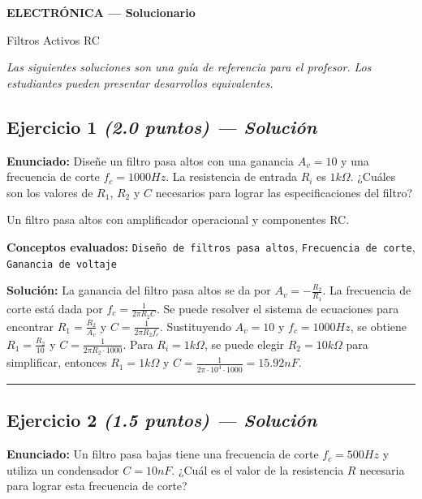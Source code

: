 \documentclass[11pt,a4paper]{article}
\newcommand{\bandaTitulo}[2]{%
  \begin{tcolorbox}[enhanced, colback=bandaAzul, colframe=bandaAzul,
    boxrule=0pt, arc=0pt, outer arc=0pt, width=\linewidth,
    halign=center, valign=center,
    top=14pt, bottom=14pt, left=10pt, right=10pt]
    {\LARGE\bfseries\color{white}#1}\par\vspace{4pt}%
    {\small\color{white!78!black}#2}%
  \end{tcolorbox}\vspace{8pt}}
\begin{document}
\bandaTitulo{ELECTRÓNICA --- Solucionario}{Filtros Activos RC}

\vspace{4pt}
\noindent\textit{Las siguientes soluciones son una guía de referencia para el profesor.}
\textit{Los estudiantes pueden presentar desarrollos equivalentes.}
\vspace{8pt}


\subsection*{Ejercicio 1 \normalfont\normalsize\textit{(2.0 puntos) --- Solución}}
\textbf{Enunciado:}
Diseñe un filtro pasa altos con una ganancia $A_v = 10$ y una frecuencia de corte $f_c = 1000 Hz$. La resistencia de entrada $R_i$ es $1 k\Omega$. ¿Cuáles son los valores de $R_1$, $R_2$ y $C$ necesarios para lograr las especificaciones del filtro?

  \begin{tcolorbox}[colback=gray!5, colframe=gray!40, fonttitle=\bfseries, title={Diagrama sugerido}]
    Un filtro pasa altos con amplificador operacional y componentes RC.
  \end{tcolorbox}

\vspace{2mm}
\textbf{Conceptos evaluados:} \texttt{Diseño de filtros pasa altos}, \texttt{Frecuencia de corte}, \texttt{Ganancia de voltaje}

\vspace{2mm}
\textbf{Solución:}
La ganancia del filtro pasa altos se da por $A_v = -\frac{R_2}{R_1}$. La frecuencia de corte está dada por $f_c = \frac{1}{2\pi R_2C}$. Se puede resolver el sistema de ecuaciones para encontrar $R_1 = \frac{R_2}{A_v}$ y $C = \frac{1}{2\pi R_2 f_c}$. Sustituyendo $A_v = 10$ y $f_c = 1000 Hz$, se obtiene $R_1 = \frac{R_2}{10}$ y $C = \frac{1}{2\pi R_2 \cdot 1000}$. Para $R_i = 1 k\Omega$, se puede elegir $R_2 = 10 k\Omega$ para simplificar, entonces $R_1 = 1 k\Omega$ y $C = \frac{1}{2\pi \cdot 10^4 \cdot 1000} = 15.92 nF$.

\vspace{4pt}
\rule{\linewidth}{0.2pt}
\vspace{6pt}



\subsection*{Ejercicio 2 \normalfont\normalsize\textit{(1.5 puntos) --- Solución}}
\textbf{Enunciado:}
Un filtro pasa bajas tiene una frecuencia de corte $f_c = 500 Hz$ y utiliza un condensador $C = 10 nF$. ¿Cuál es el valor de la resistencia $R$ necesaria para lograr esta frecuencia de corte?
\end{document}
